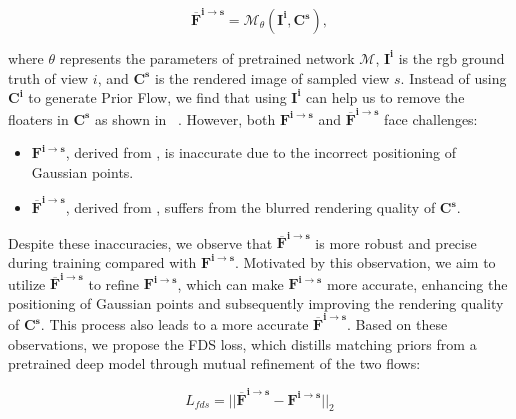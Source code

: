 \begin{equation}
\bm{\overline{F}^{i\rightarrow s}} = \mathcal{M}_{\theta}(\bm{I^i}, \bm{C^s}),  
\label{equ:mflow}
\end{equation}

where 
$\theta$ represents the parameters of pretrained network $\mathcal{M}$,
$\bm{I^i}$ is the rgb ground truth of view $i$, and $\bm{C^s}$ is the 
rendered image of sampled view $s$. 
%
Instead of using $\bm{C^i}$ to generate Prior Flow, we find that using 
$\bm{I^i}$ can 
help us to remove the floaters in $\bm{C^s}$ as shown in ~.
%
However, both $\bm{F^{i\rightarrow s}}$ and 
$\bm{\overline{F}^{i\rightarrow s}}$ face challenges:
\begin{itemize}
    \item $\bm{F^{i\rightarrow s}}$, 
    derived from , 
    is inaccurate due to the incorrect positioning 
    of Gaussian points.
    \item $\bm{\overline{F}^{i\rightarrow s}}$, derived from , 
    suffers from the blurred rendering quality of $\bm{C^s}$.
\end{itemize}



Despite these inaccuracies, we observe 
that $\bm{\overline{F}^{i\rightarrow s}}$ is
more robust and precise during training compared with $\bm{F^{i\rightarrow s}}$.
Motivated by this observation, we aim to utilize $\bm{\overline{F}^{i\rightarrow s}}$
to refine $\bm{F^{i\rightarrow s}}$, which can make $\bm{F^{i\rightarrow s}}$ more accurate, 
enhancing the positioning of Gaussian points and subsequently 
improving the rendering quality of $\bm{C^s}$. 
%
This process  also leads to a more accurate $\bm{\overline{F}^{i\rightarrow s}}$. 
Based on these observations, we propose the FDS loss, which distills
matching priors from a pretrained deep model through mutual 
refinement of the two flows:

\begin{equation}
L_{fds} =  || \bm{\overline{F}^{i\rightarrow s}} - \bm{F^{i\rightarrow s}} ||_2
\label{equ:fds}
\end{equation}



